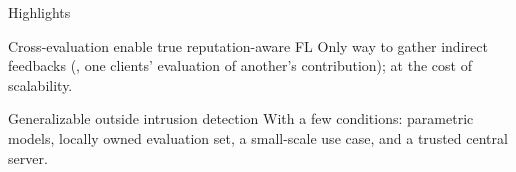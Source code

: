 \begin{frame}{Highlights}

  \begin{block}{Cross-evaluation enable \alert{true} reputation-aware FL}
    Only way to gather indirect feedbacks (\ie, one clients' evaluation of another's contribution); at the cost of scalability.
  \end{block}

  \pause
  \begin{block}{Generalizable outside intrusion detection}
    With a few conditions: parametric models, locally owned evaluation set, a \alert{small-scale use case}, and a \alert{trusted central server}.
  \end{block}
\end{frame}





